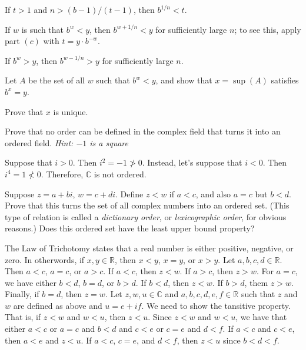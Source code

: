 \begin{exercise}
\begin{exercise}[label = (\alph*)]
  \item
    If \(t > 1\) and \(n > (b - 1)/(t - 1)\), then \(b^{1/n} < t\).
  \item
    If \(w\) is such that \(b^w < y\), then \(b^{w + 1/n} < y\) for
    sufficiently large \(n\); to see this, apply part \((c)\) with
    \(t = y\cdot b^{-w}\).
  \item
    If \(b^w > y\), then \(b^{w - 1/n} > y\) for sufficiently large \(n\).
  \item
    Let \(A\) be the set of all \(w\) such that \(b^w < y\), and show that
    \(x = \sup(A)\) satisfies \(b^x = y\).
  \item
    Prove that \(x\) is unique.
  \end{exercise}
\item
  Prove that no order can be defined in the complex field that turns it into an
  ordered field.
  \textit{Hint: \(-1\) is a square}
  \par\smallskip
  Suppose that \(i > 0\).
  Then \(i^2 = -1 \ngtr 0\).
  Instead, let's suppose that \(i < 0\).
  Then \(i^4 = 1 \nless 0\).
  Therefore, \(\mathbb{C}\) is not ordered.
\item
  Suppose \(z = a + bi\), \(w = c + di\).
  Define \(z < w\) if \(a < c\), and also \(a = c\) but \(b < d\).
  Prove that this turns the set of all complex numbers into an ordered set.
  (This type of relation is called a \textit{dictionary order}, or
  \textit{lexicographic order}, for obvious reasons.)
  Does this ordered set have the least upper bound property?
  \par\smallskip
  The Law of Trichotomy states that a real number is either positive,
  negative, or zero.
  In otherwords, if \(x,y\in\mathbb{R}\), then \(x < y\), \(x = y\), or
  \(x > y\).
  Let \(a,b,c,d\in\mathbb{R}\).
  Then \(a < c\), \(a = c\), or \(a > c\).
  If \(a < c\), then \(z < w\).
  If \(a > c\), then \(z > w\).
  For \(a = c\), we have either \(b < d\), \(b = d\), or \(b > d\).
  If \(b < d\), then \(z < w\).
  If \(b > d\), them \(z > w\).
  Finally, if \(b = d\), then \(z = w\).
  Let \(z,w,u\in\mathbb{C}\) and \(a,b,c,d,e,f\in\mathbb{R}\) such that
  \(z\) and \(w\) are defined as above and \(u = e + if\).
  We need to show the tansitive property.
  That is, if \(z < w\) and \(w < u\), then \(z < u\).
  Since \(z < w\) and \(w < u\), we have that either \(a < c\) or \(a = c\) and
  \(b < d\) and \(c < e\) or \(c = e\) and \(d < f\).
  If \(a < c\) and \(c < e\), then \(a < e\) and \(z < u\).
  If \(a < c\), \(c = e\), and \(d < f\), then \(z < u\) since \(b < d < f\).

\end{exercise}
